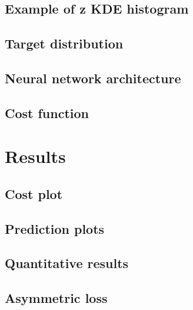 \documentclass[aspectratio=169, 10pt]{beamer}
\begin{document}
\subsection{Example of z KDE histogram}


\subsection{Target distribution}


% 

\subsection{Neural network architecture}

% 

\subsection{Cost function}



\section{Results}

\subsection{Cost plot}


\subsection{Prediction plots}


\subsection{Quantitative results}


\subsection{Asymmetric loss}

\end{document}
